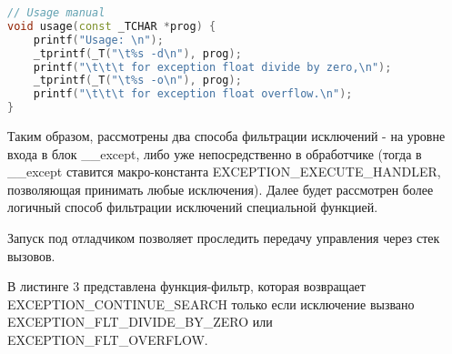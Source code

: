 \documentclass[a4paper,12pt]{article} %
\begin{document}
\begin{lstlisting}[language=C++, caption={Получение кода исключения с помощью функции GetExceptionCode}]
// Usage manual
void usage(const _TCHAR *prog) {
	printf("Usage: \n");
	_tprintf(_T("\t%s -d\n"), prog);
	printf("\t\t\t for exception float divide by zero,\n");
	_tprintf(_T("\t%s -o\n"), prog);
	printf("\t\t\t for exception float overflow.\n");
}
\end{lstlisting}

Таким образом, рассмотрены два способа фильтрации исключений - на уровне входа в блок \_\_except, либо уже непосредственно в обработчике (тогда в \_\_except ставится макро-константа EXCEPTION\_EXECUTE\_HANDLER, позволяющая принимать любые исключения). Далее будет рассмотрен более логичный способ фильтрации исключений специальной функцией.

Запуск под отладчиком позволяет проследить передачу управления через стек вызовов.
\newpage

В листинге 3 представлена функция-фильтр, которая возвращает \\ EXCEPTION\_CONTINUE\_SEARCH только если исключение вызвано \\ EXCEPTION\_FLT\_DIVIDE\_BY\_ZERO или EXCEPTION\_FLT\_OVERFLOW.
\end{document}
